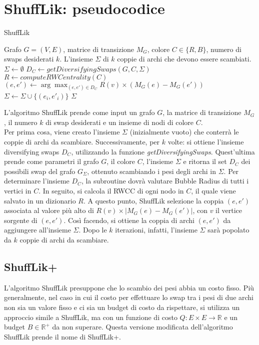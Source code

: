 \section{ShuffLik: pseudocodice}
\begin{algorithm}[!h]
    \caption{ShuffLik}\label{alg:shufflik}
    \begin{algorithmic}
    \Require Grafo $G=(V,E)$, matrice di transizione $M_G$, colore $C \in \{R,B\}$, numero di swaps desiderati $k$.
    \Ensure L'insieme $\Sigma$ di $k$ coppie di archi che devono essere scambiati.
    \\
    \State $\Sigma \gets \emptyset$
        \State $D_C \gets getDiversifyingSwaps(G,C,\Sigma)$
        \State $R \gets computeRWCentrality(C)$
        \State $(e,e') \gets \arg\max_{(e,e') \in D_C} R(v)\times (M_G(e)-M_G(e'))$
        \State $\Sigma \gets \Sigma \cup \{(e_i,e'_i)\}$
    \EndFor
    \State\Return $\Sigma$
    \end{algorithmic}
\end{algorithm}
L'algoritmo ShuffLik prende come input un grafo $G$, la matrice di transizione $M_G$, 
il numero $k$ di swap desiderati e un insieme di nodi di colore $C$. \\
Per prima cosa, viene creato l'insieme $\Sigma$ (inizialmente vuoto) che conterrà le coppie 
di archi da scambiare. Successivamente, per $k$ volte: si ottiene 
l'insieme diversifying swaps $D_C$, utilizzando la funzione \emph{getDiversifyingSwaps}.
Quest'ultima prende come parametri il grafo $G$, il colore $C$, l'insieme $\Sigma$ e ritorna il set
$D_C$ dei possibili swap del grafo $G_\Sigma$, ottenuto scambiando i pesi degli archi in $\Sigma$. 
Per determinare l'insieme $D_C$, la subroutine dovrà valutare Bubble Radius di tutti i vertici in $C$.
In seguito, si calcola il RWCC di ogni nodo in $C$, il quale viene salvato in un dizionario $R$. 
A questo punto, ShuffLik selezione la coppia $(e,e')$ associata al valore più alto di $R(v)\times |M_G(e)-M_G(e')|$,
con $v$ il vertice sorgente di $(e,e')$. Così facendo, si ottiene la coppia di archi $(e,e')$ da aggiungere all'insieme $\Sigma$.
Dopo le $k$ iterazioni, infatti, l'insieme $\Sigma$ sarà popolato da $k$ coppie di archi da scambiare.
\subsection{ShuffLik+}
L'algoritmo ShuffLik presuppone che lo scambio dei pesi abbia un costo fisso. 
Più generalmente, nel caso in cui il costo per effettuare lo swap tra i pesi di due archi non sia un valore fisso e ci sia un budget di costo
da rispettare, si utilizza un approccio simile a ShuffLik, ma con un funzione di costo $Q: E\times E \to \mathbb{R}$ e un budget $B \in \mathbb{R}^+$ da 
non superare. Questa versione modificata dell'algoritmo ShuffLik prende il nome di ShuffLik+.

